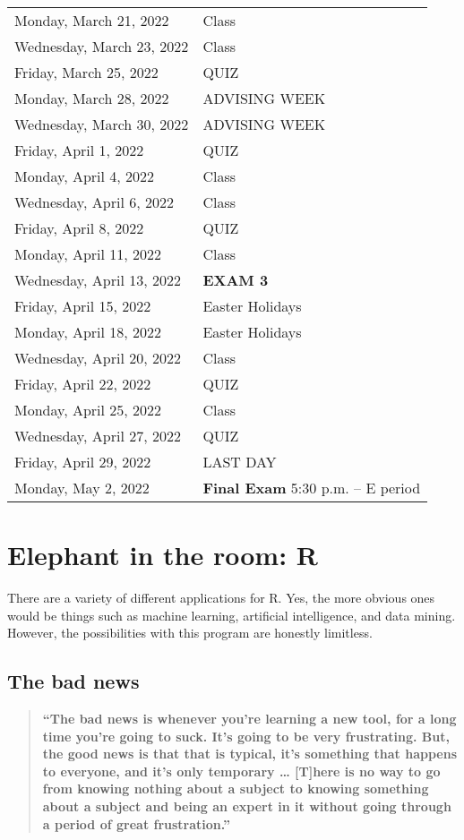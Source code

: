 \documentclass[
]{book}
\begin{document}
\begin{longtable}[]{@{}ll@{}}
Monday, March 21, 2022 & Class \\
Wednesday, March 23, 2022 & Class \\
Friday, March 25, 2022 & QUIZ \\
Monday, March 28, 2022 & ADVISING WEEK \\
Wednesday, March 30, 2022 & ADVISING WEEK \\
Friday, April 1, 2022 & QUIZ \\
Monday, April 4, 2022 & Class \\
Wednesday, April 6, 2022 & Class \\
Friday, April 8, 2022 & QUIZ \\
Monday, April 11, 2022 & Class \\
Wednesday, April 13, 2022 & \textbf{EXAM 3} \\
Friday, April 15, 2022 & Easter Holidays \\
Monday, April 18, 2022 & Easter Holidays \\
Wednesday, April 20, 2022 & Class \\
Friday, April 22, 2022 & QUIZ \\
Monday, April 25, 2022 & Class \\
Wednesday, April 27, 2022 & QUIZ \\
Friday, April 29, 2022 & LAST DAY \\
Monday, May 2, 2022 & \textbf{Final Exam} 5:30 p.m. -- E period \\
\bottomrule
\end{longtable}

\hypertarget{elephant-in-the-room-r}{%
\chapter{\texorpdfstring{Elephant in the room: \textbf{R}}{Elephant in the room: R}}\label{elephant-in-the-room-r}}

There are a variety of different applications for R. Yes, the more obvious ones would be things such as machine learning, artificial intelligence, and data mining. However, the possibilities with this program are honestly limitless.

\hypertarget{the-bad-news}{%
\section{The bad news}\label{the-bad-news}}

\begin{quote}
\textbf{``The bad news is whenever you're learning a new tool, for a long time you're going to suck. It's going to be very frustrating. But, the good news is that that is typical, it's something that happens to everyone, and it's only temporary \ldots{} {[}T{]}here is no way to go from knowing nothing about a subject to knowing something about a subject and being an expert in it without going through a period of great frustration.''}
\end{quote}
\end{document}

